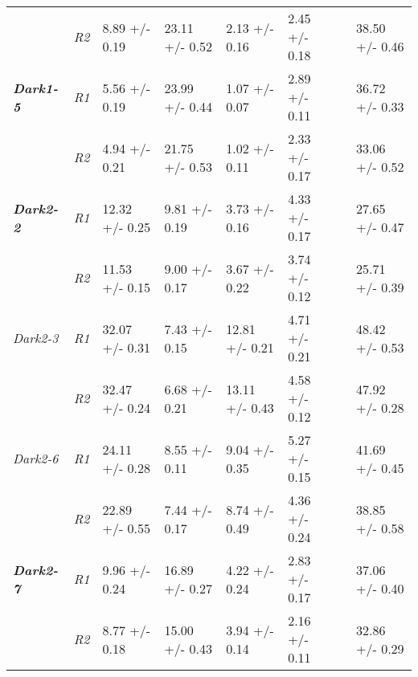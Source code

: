 \begin{table}[h]
\begin{tabularx}{\textwidth}{|l||l|l|l|l|l|l|l|}
                              & \textit{R2}                   & 8.89 +/- 0.19      & 23.11 +/- 0.52    & 2.13 +/- 0.16      & 2.45 +/- 0.18          &  & 38.50 +/- 0.46      \\ \cmidrule(r){1-6} \cmidrule(l){8-8} 
         \textbf{\textit{Dark1-5}}     & \textit{R1}          & 5.56 +/- 0.19      & 23.99 +/- 0.44    & 1.07 +/- 0.07      & 2.89 +/- 0.11          &  & 36.72 +/- 0.33      \\ \cmidrule(lr){2-2}
                              & \textit{R2}                   & 4.94 +/- 0.21      & 21.75 +/- 0.53    & 1.02 +/- 0.11      & 2.33 +/- 0.17          &  & 33.06 +/- 0.52      \\ \cmidrule(r){1-6} \cmidrule(l){8-8} 
         \textbf{\textit{Dark2-2}}     & \textit{R1}          & 12.32 +/- 0.25     & 9.81 +/- 0.19     & 3.73 +/- 0.16      & 4.33 +/- 0.17          &  & 27.65 +/- 0.47      \\ \cmidrule(lr){2-2}
                              & \textit{R2}                   & 11.53 +/- 0.15     & 9.00 +/- 0.17     & 3.67 +/- 0.22      & 3.74 +/- 0.12          &  & 25.71 +/- 0.39      \\ \cmidrule(r){1-6} \cmidrule(l){8-8} 
         \textit{Dark2-3}     & \textit{R1}                   & 32.07 +/- 0.31     & 7.43 +/- 0.15     & 12.81 +/- 0.21     & 4.71 +/- 0.21          &  & 48.42 +/- 0.53      \\ \cmidrule(lr){2-2}
                              & \textit{R2}                   & 32.47 +/- 0.24     & 6.68 +/- 0.21     & 13.11 +/- 0.43     & 4.58 +/- 0.12          &  & 47.92 +/- 0.28      \\ \cmidrule(r){1-6} \cmidrule(l){8-8} 
         \textit{Dark2-6}     & \textit{R1}                   & 24.11 +/- 0.28     & 8.55 +/- 0.11     & 9.04 +/- 0.35      & 5.27 +/- 0.15          &  & 41.69 +/- 0.45      \\ \cmidrule(lr){2-2}
                              & \textit{R2}                   & 22.89 +/- 0.55     & 7.44 +/- 0.17     & 8.74 +/- 0.49      & 4.36 +/- 0.24          &  & 38.85 +/- 0.58      \\ \cmidrule(r){1-6} \cmidrule(l){8-8} 
         \textbf{\textit{Dark2-7}}     & \textit{R1}          & 9.96 +/- 0.24      & 16.89 +/- 0.27    & 4.22 +/- 0.24      & 2.83 +/- 0.17          &  & 37.06 +/- 0.40      \\ \cmidrule(lr){2-2}
                              & \textit{R2}                   & 8.77 +/- 0.18      & 15.00 +/- 0.43    & 3.94 +/- 0.14      & 2.16 +/- 0.11          &  & 32.86 +/- 0.29      \\ \cmidrule(r){1-6} \cmidrule(l){8-8} 

\end{tabularx}
\end{table}
